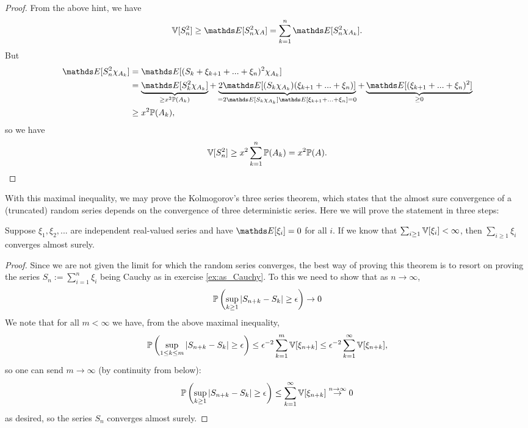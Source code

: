 \begin{proof}
From the above hint, we have
\begin{equation*}
    \V[S_n^2] \geq \E[S_n^2 \chi_A] = \sum_{k=1}^n \E[S_n^2 \chi_{A_k}].
\end{equation*}
But 
\begin{align*}
    \E[S_n^2 \chi_{A_k}] &= \E[(S_k + \xi_{k+1} + ... + \xi_n)^2 \chi_{A_k}] \\
    &= \underbrace{\E[S_k^2 \chi_{A_k}]}_{\geq x^2 \p(A_k)} + \underbrace{2\E[(S_k \chi_{A_k})(\xi_{k+1} + ... + \xi_n)]}_{= 2\E[S_k \chi_{A_k}] \E[\xi_{k+1} + ... + \xi_n] = 0} + \underbrace{\E[(\xi_{k+1} + ... + \xi_n)^2]}_{\geq 0} \\
    &\geq x^2 \p(A_k),
\end{align*}
so we have
\begin{equation}
    \mathbb{V}[S_n^2] \geq x^2 \sum_{k=1}^n \mathbb{P}(A_k) = x^2 \mathbb{P}(A).
\end{equation}
\end{proof}

With this maximal inequality, we may prove the Kolmogorov's three series theorem, which states that the almost sure convergence of a (truncated) random series depends on the convergence of three deterministic series. Here we will prove the statement in three steps:

\begin{lemma} \label{lem:three_series_1}
Suppose $\xi_1, \xi_2, ...$ are independent real-valued series and have $\E[\xi_i] = 0$ for all $i$. If we know that $\sum_{i\geq 1} \mathbb{V}[\xi_i] < \infty$, then $\sum_{i\geq 1} \xi_i$ converges almost surely.
\end{lemma}

\begin{proof}
Since we are not given the limit for which the random series converges, the best way of proving this theorem is to resort on proving the series $S_n := \sum_{i=1}^n \xi_i$ being Cauchy as in exercise \ref{ex:as_Cauchy}. To this we need to show that as $n \to \infty$,
\begin{equation*}
    \mathbb{P}\left( \sup_{k\geq 1} |S_{n+k} - S_k| \geq \epsilon \right) \to 0
\end{equation*}
We note that for all $m < \infty$ we have, from the above maximal inequality,
\begin{equation}
    \mathbb{P}\left( \sup_{1 \leq k \leq m} |S_{n+k} - S_k| \geq \epsilon \right) \leq \epsilon^{-2} \sum_{k=1}^m \mathbb{V}[\xi_{n+k}] \leq \epsilon^{-2} \sum_{k=1}^\infty \mathbb{V}[\xi_{n+k}],
\end{equation}
so one can send $m \to \infty$ (by continuity from below):
\begin{equation}
\mathbb{P}\left( \sup_{k \geq 1} |S_{n+k} - S_k| \geq \epsilon \right) \leq \sum_{k=1}^\infty \mathbb{V}[\xi_{n+k}] \overset{n \to \infty}{\to} 0
\end{equation}
as desired, so the series $S_n$ converges almost surely.
\end{proof}

